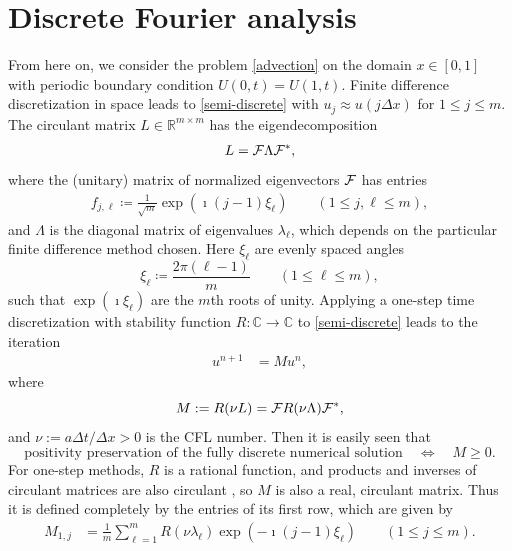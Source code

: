 \documentclass[a4paper]{article}
\newcommand{\dt}{\Delta t}
\newcommand{\dx}{\Delta x}
\newcommand{\cF}{{\cal{F}}}
\begin{document}
\section{Discrete Fourier analysis}\label{sectiondiscFourier}
From here on, we consider the problem \eqref{advection} on the domain $x\in[0,1]$
with periodic boundary condition $U(0,t)=U(1,t)$.  Finite difference discretization
in space leads to \eqref{semi-discrete} with $u_j\approx u(j\dx)$ for $1\le j\le m$. 
The circulant matrix $L\in\mathbb{R}^{m\times m}$ has the eigendecomposition
\begin{align}\label{eigen}
    L  = \cF \Lambda \cF^*,
\end{align}
where the (unitary) matrix of normalized eigenvectors $\cF$ has entries
\begin{align}\label{eigenvectrors}
    f_{j,\ell}  \coloneqq \frac{1}{\sqrt{m}}\exp(\imath  (j-1) \xi_\ell)  \quad\quad (1 \le j, \ell \le m),
\end{align}
and $\Lambda$ is the diagonal matrix of eigenvalues $\lambda_\ell$, which depends on the
particular finite difference method chosen.  Here $\xi_\ell$ are evenly spaced angles 
\begin{equation}\label{xildef}
    \xi_\ell  \coloneqq \frac{2\pi(\ell-1)}{m} \quad\quad (1 \le \ell \le m),
\end{equation}
such that $\exp(\imath\xi_\ell)$ are the $m$th roots of unity.
Applying a one-step time
discretization with stability function $R:\mathbb{C}\to\mathbb{C}$ to \eqref{semi-discrete} leads to
the iteration
\begin{align}\label{M}
    u^{n+1} & = M u^n,
\end{align}
where 
\begin{equation}\label{Mdualdef}
M:=R(\nu L)=\cF R(\nu \Lambda) \cF^*, 
\end{equation}
and $\nu:=a\dt/\dx>0$ is the CFL number.  
Then it is easily seen that 
\[
\text{positivity preservation of the fully discrete numerical solution}\quad \Longleftrightarrow \quad M\ge 0.
\]
For one-step methods, $R$ is a rational function, and products and inverses of circulant matrices are also circulant \cite[Fact 5.16.7]{matmat}, so
$M$ is also a real, circulant matrix.
Thus it is defined completely by the entries of its first row, which
are given by
\begin{align} \label{M-entries}
    M_{1,j} & = \frac{1}{m} \sum_{\ell=1}^m R(\nu\lambda_\ell) \exp(-\imath(j-1)\xi_\ell) \quad\quad (1\le j\le m).
\end{align}
\end{document}
